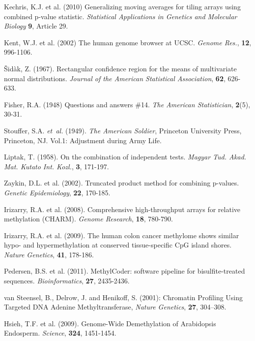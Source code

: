 \documentclass{bioinfo}
\begin{document}
\begin{thebibliography}{}
Kechris, K.J. et al. (2010)
Generalizing moving averages for tiling arrays using combined p-value
statistic. {\it Statistical Applications in Genetics and Molecular Biology}
{\bf 9}, Article 29.

 Kent, W.J. et al. (2002) The human genome browser at UCSC. {\it Genome Res.}, {\bf 12}, 996-1106.

Šidàk, Z. (1967).
Rectangular conﬁdence region for the means of multivariate normal distributions.
\textit{Journal of the American Statistical Association}, {\bf 62}, 626-633.

Fisher, R.A. (1948)
Questions and answers \#14.
{\it The American Statistician}, {\bf 2}(5), 30-31.

Stouffer, S.A. \textit{et~al.} (1949). \textit{The American Soldier},
Princeton University Press, Princeton, NJ. Vol.1: Adjustment during Army Life.

Liptak, T. (1958). On the combination of independent tests. {\it Magyar Tud.
Akad. Mat. Kutato Int. Kozl.}, {\bf 3}, 171-197.

 Zaykin, D.L. et al. (2002).
Truncated product method for combining p-values. {\it Genetic Epidemiology},
{\bf 22}, 170-185.

 Irizarry, R.A. et al.
(2008). Comprehensive high-throughput arrays for relative methylation (CHARM).
{\it Genome Research}, {\bf 18}, 780-790.

 Irizarry, R.A. et al.
(2009). The human colon cancer methylome shows similar hypo- and
hypermethylation at conserved tissue-specific CpG island shores.
{\it Nature Genetics}, {\bf 41}, 178-186.

 Pedersen, B.S. et al.
(2011). MethylCoder: software pipeline for bisulfite-treated sequences.
{\it Bioinformatics}, {\bf 27}, 2435-2436.

van Steensel, B., Delrow, J. and Henikoff, S. (2001): Chromatin Profiling Using Targeted DNA Adenine Methyltransferase,
{\it Nature Genetics}, {\bf 27}, 304–308.

 Hsieh, T.F. et al. (2009). Genome-Wide Demethylation of Arabidopsis Endosperm.
{\it Science}, {\bf 324}, 1451-1454.

\end{thebibliography}
\end{document}
